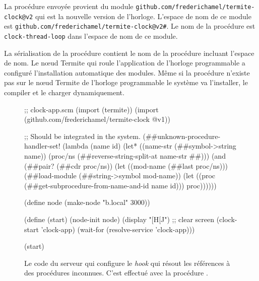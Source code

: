 La procédure envoyée provient du module
\texttt{github.com/frederichamel/termite-clock@v2} qui est la nouvelle version
de l'horloge. L'espace de nom de ce module est
\texttt{github.com/frederichamel/termite-clock@v2\#}. Le nom de la procédure
est \texttt{clock-thread-loop} dans l'espace de nom de ce module.

La sérialisation de la procédure contient le nom de la procédure incluant
l'espace de nom. Le nœud Termite qui roule l'application de l'horloge
programmable a configuré l'installation automatique des modules. Même si la
procédure n'existe pas sur le nœud Termite de l'horloge programmable le système
va l'installer, le compiler et le charger dynamiquement.\\


\begin{figure}[ht]
  \centering\fontsize{12}{8}
\begin{mplisting}{1}
;; clock-app.scm
(import (termite))
(import (github.com/frederichamel/termite-clock @v1))

;; Should be integrated in the system.
(##unknown-procedure-handler-set!
  (lambda (name id)
    (let* ((name-str (##symbol->string name))
           (proc/ns (##reverse-string-split-at name-str #\#)))
      (and (##pair? (##cdr proc/ns))
           (let ((mod-name (##last proc/ns)))
             (##load-module (##string->symbol mod-name))
             (let ((proc (##get-subprocedure-from-name-and-id name id)))
               proc))))))

(define node (make-node "b.local" 3000))

(define (start)
  (node-init node)
  (display "[H[J") ;; clear screen
  (clock-start 'clock-app)
  (wait-for (resolve-service 'clock-app)))

(start)
\end{mplisting}
  \caption{Le code du serveur qui configure le \textit{hook}
    qui résout les références à des procédures inconnues.
    C'est effectué avec la procédure
    .}
  \vspace*{4ex}
\end{figure}


